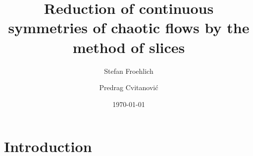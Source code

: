 \documentclass[final,3p,times]{elsarticle}	%
\begin{document}
\title{Reduction of continuous symmetries of chaotic flows
       by the method of slices}

\author{Stefan Froehlich}

\author{Predrag Cvitanovi\'{c}}

\address{Center for Nonlinear Science,
        School of Physics, Georgia Institute of Technology,
        Atlanta, GA 30332-0430}

\date{\today}

\begin{abstract}
    
\end{abstract}


\maketitle %


%

\section{Introduction}
    \label{sec:intro}
    
\end{document}

